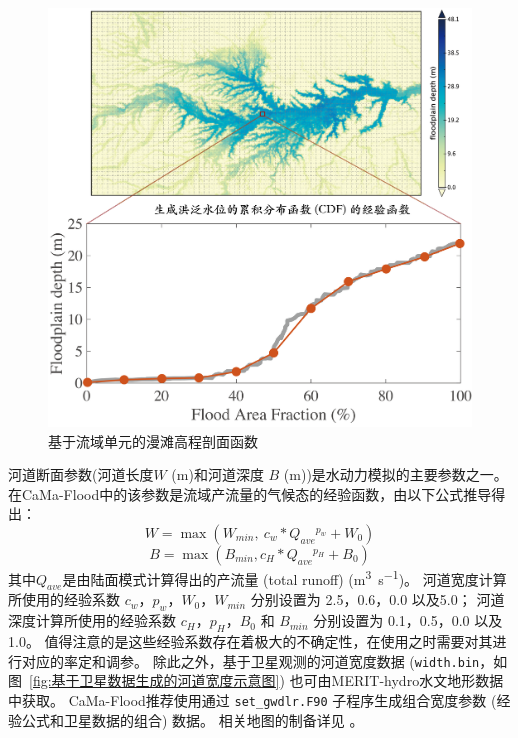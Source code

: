 {
  \begin{figure}[htbp]
    \centering
    \includegraphics[width=1.0\textwidth]{Figures/陆地表面的水分循环/基于流域单元的漫滩高程剖面函数.png}
    \caption{基于流域单元的漫滩高程剖面函数}
    \label{fig:基于流域单元的漫滩高程剖面函数}
  \end{figure}
}


河道断面参数(河道长度$W$ (m)和河道深度 $B$ (m))是水动力模拟的主要参数之一。在CaMa-Flood中的该参数是流域产流量的气候态的经验函数，由以下公式推导得出：
\begin{equation}
  W=\max \left(W_{min},\ c_{w} * Q_{ave}{}^{p_{w}}+W_{0}\right)
\end{equation}
\begin{equation}
  B=\max \left(B_{min}, c_{H} * Q_{ave}{}^{p_{H}}+B_{0}\right)
\end{equation}
其中$Q_{ave}$是由陆面模式计算得出的产流量 (total runoff) (\unit{m^3.s^{-1}})。
河道宽度计算所使用的经验系数 $c_w$，$p_w$，$W_0$，$W_{min}$ 分别设置为 2.5，0.6，0.0 以及5.0；
河道深度计算所使用的经验系数 $c_H$，$p_H$，$B_0$ 和 $B_{min}$ 分别设置为 0.1，0.5，0.0 以及1.0。
值得注意的是这些经验系数存在着极大的不确定性，在使用之时需要对其进行对应的率定和调参。
除此之外，基于卫星观测的河道宽度数据 (\texttt{width.bin}，如图~\ref{fig:基于卫星数据生成的河道宽度示意图}) 也可由MERIT-hydro水文地形数据中获取。
CaMa-Flood推荐使用通过 \texttt{set\_gwdlr.F90} 子程序生成组合宽度参数 (经验公式和卫星数据的组合) 数据。
相关地图的制备详见 \citet{yamazaki2014regional, yamazaki2014development}。

